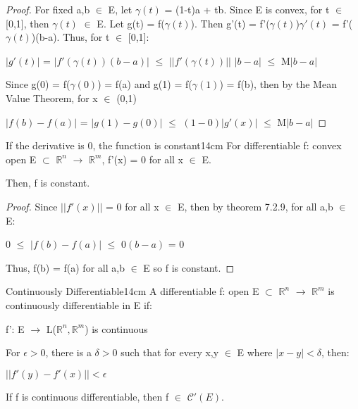    \begin{proof}
        For fixed a,b $\in$ E, let $\gamma(t)$ = (1-t)a + tb.
        Since E is convex, for t $\in$ [0,1], then $\gamma(t)$ $\in$ E.
        Let g(t) = f($\gamma(t)$).
        Then g'(t) = f'($\gamma(t)$)$\gamma'(t)$
        = f'($\gamma(t)$)(b-a). Thus, for t $\in$ [0,1]:

        \hspace{0.5cm}
        $|g'(t)|$
        = $|f'(\gamma(t))(b-a)|$
        $\leq$ $||f'(\gamma(t))||$ $|b-a|$
        $\leq$ M$|b-a|$

        Since g(0) = f($\gamma(0)$) = f(a)
        and g(1) = f($\gamma(1)$) = f(b), then by the Mean Value Theorem,
        for x $\in$ (0,1)

        \hspace{0.5cm}
        $|f(b) - f(a)|$
        = $|g(1) - g(0)|$
        $\leq$ $(1-0) |g'(x)|$
        $\leq$ M$|b-a|$
    \end{proof}

    \vspace{0.5cm}



    \begin{corollary}{If the derivative is 0, the function is constant}{14cm}
        For differentiable f: convex open E $\subset$ $\mathbb{R}^n$
        $\rightarrow$ $\mathbb{R}^m$, f'(x) = 0 for all x $\in$ E.
        
        Then, f is constant.
    \end{corollary}

    \begin{proof}
        Since $||f'(x)||$ = 0 for all x $\in$ E,
        then by {\color{red} theorem 7.2.9}, for all a,b $\in$ E:
        
        \hspace{0.5cm}
        0 $\leq$ $|f(b) - f(a)|$ $\leq$ $0(b-a)$ = 0

        Thus, f(b) = f(a) for all a,b $\in$ E so f is constant.
    \end{proof}

    \newpage



    \begin{definition}{Continuously Differentiable}{14cm}
        A differentiable f: open E $\subset$ $\mathbb{R}^n$
        $\rightarrow$ $\mathbb{R}^m$ is continuously differentiable
        in E if:
        
        \hspace{0.5cm}
        f': E $\rightarrow$ L($\mathbb{R}^n,\mathbb{R}^m$) is continuous

        For $\epsilon > 0$, there is a $\delta > 0$ such that for
        every x,y $\in$ E where $|x-y| < \delta$, then:

        \hspace{0.5cm}
        $||f'(y) - f'(x)|| < \epsilon$

        If f is continuous differentiable, then f $\in$ $\mathscr{C}'(E)$.
    \end{definition}

